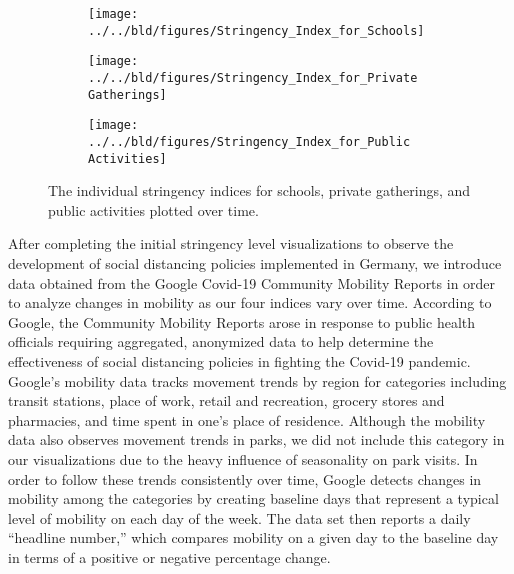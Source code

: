 \begin{figure}[p]
     \centering
     \begin{subfigure}[b]{0.72\textwidth}
         \centering
         \texttt{[image: ../../bld/figures/Stringency\_Index\_for\_Schools]}
         \caption{}
         \label{fig:schoolindex}
     \end{subfigure}
     \hfill
     \begin{subfigure}[b]{0.72\textwidth}
         \centering
         \texttt{[image: ../../bld/figures/Stringency\_Index\_for\_Private Gatherings]}
         \caption{}
         \label{fig:gatheringsindex}
     \end{subfigure}
     \hfill
     \begin{subfigure}[b]{0.72\textwidth}
         \centering
         \texttt{[image: ../../bld/figures/Stringency\_Index\_for\_Public Activities]}
         \caption{}
         \label{fig:publicindex}
     \end{subfigure}
        \caption{The individual stringency indices for schools, private gatherings, and public activities plotted over time.}
        \label{fig:3stringencygraphs}
\end{figure}

After completing the initial stringency level visualizations to observe the development of social distancing policies implemented in Germany, we introduce data obtained from the Google Covid-19 Community Mobility Reports in order to analyze changes in mobility as our four indices vary over time. According to Google, the Community Mobility Reports arose in response to public health officials requiring aggregated, anonymized data to help determine the effectiveness of social distancing policies in fighting the Covid-19 pandemic. Google’s mobility data tracks movement trends by region for categories including transit stations, place of work, retail and recreation, grocery stores and pharmacies, and time spent in one’s place of residence. Although the mobility data also observes movement trends in parks, we did not include this category in our visualizations due to the heavy influence of seasonality on park visits. In order to follow these trends consistently over time, Google detects changes in mobility among the categories by creating baseline days that represent a typical level of mobility on each day of the week. The data set then reports a daily “headline number,” which compares mobility on a given day to the baseline day in terms of a positive or negative percentage change.

